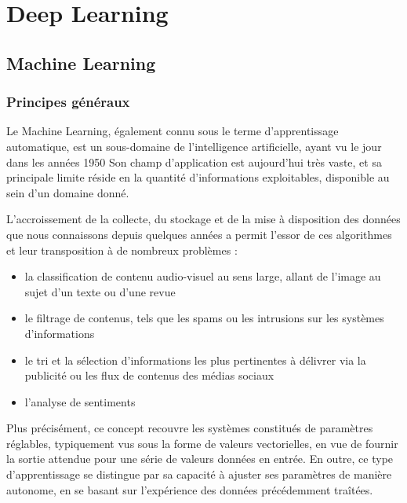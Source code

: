 \documentclass[a4paper,10pt]{report}
\title{}
\author{}
\begin{document}
\maketitle

\chapter{Deep Learning}

\section{Machine Learning}

\subsection{Principes généraux}

Le Machine Learning, également connu sous le terme d'apprentissage automatique, est un sous-domaine de l'intelligence artificielle, ayant vu le jour dans
les années 1950\cite{Bib_Marr}\cite{Bib_McCar}
Son champ d'application est aujourd'hui très vaste, et sa principale limite réside en la quantité d'informations exploitables, disponible au sein d'un domaine donné.


L'accroissement de la collecte, du stockage et de la mise à disposition des données que nous connaissons depuis quelques années a permit l'essor de ces algorithmes et leur transposition à de nombreux problèmes :

\begin{itemize}
  \item la classification de contenu audio-visuel au sens large, allant de l'image au sujet d'un texte ou d'une revue
  \item le filtrage de contenus, tels que les spams ou les intrusions sur les systèmes d'informations
  \item le tri et la sélection d'informations les plus pertinentes à délivrer via la publicité ou les flux de contenus des médias sociaux
  \item l'analyse de sentiments
\end{itemize}

Plus précisément, ce concept recouvre les systèmes constitués de paramètres réglables, typiquement vus sous la forme de
valeurs vectorielles, en vue de fournir la sortie attendue pour une série de valeurs données en entrée. En outre, ce type d'apprentissage se distingue
par sa capacité à ajuster ses paramètres de manière autonome, en se basant sur l'expérience des données précédemment traîtées.
\end{document}
